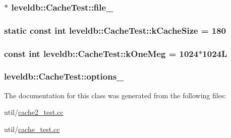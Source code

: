 \subsubsection[{file\+\_\+}]{$\ast$ leveldb\+::\+Cache\+Test\+::file\+\_\+}\label{classleveldb_1_1_cache_test_a8dc10cbcdcac090927837546c72e315a}
\hypertarget{classleveldb_1_1_cache_test_a1e4cd6b55746670711d7f57d9432b3d6}{}
\subsubsection[{k\+Cache\+Size}]{\setlength{\rightskip}{0pt plus 5cm}static const int leveldb\+::\+Cache\+Test\+::k\+Cache\+Size = 180\hspace{0.3cm}{\ttfamily [static]}}\label{classleveldb_1_1_cache_test_a1e4cd6b55746670711d7f57d9432b3d6}
\hypertarget{classleveldb_1_1_cache_test_ab9e37a17f7cfcf7397e912af9a263440}{}
\subsubsection[{k\+One\+Meg}]{\setlength{\rightskip}{0pt plus 5cm}const int leveldb\+::\+Cache\+Test\+::k\+One\+Meg = 1024$\ast$1024\+L\hspace{0.3cm}{\ttfamily [static]}}\label{classleveldb_1_1_cache_test_ab9e37a17f7cfcf7397e912af9a263440}
\hypertarget{classleveldb_1_1_cache_test_af0e716deccf8122f37eeffbd7a330971}{}
\subsubsection[{options\+\_\+}]{ leveldb\+::\+Cache\+Test\+::options\+\_\+}\label{classleveldb_1_1_cache_test_af0e716deccf8122f37eeffbd7a330971}


The documentation for this class was generated from the following files\+:\begin{DoxyCompactItemize}
\item 
util/\hyperlink{cache2__test_8cc}{cache2\+\_\+test.\+cc}\item 
util/\hyperlink{cache__test_8cc}{cache\+\_\+test.\+cc}\end{DoxyCompactItemize}
